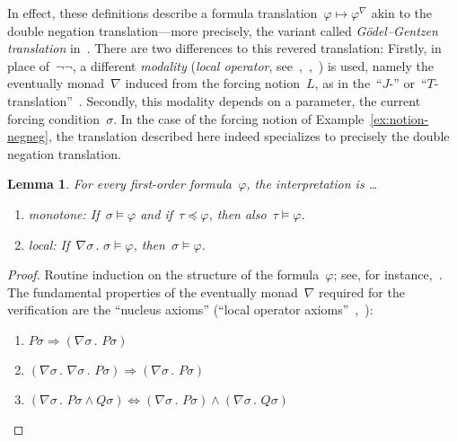 \documentclass[com,11pt,crcready]{iosart2x}
\theoremstyle{definition}
\theoremstyle{plain}
\newtheorem{lemma}[definition]{Lemma}
\theoremstyle{remark}
\newcommand{\?}{\,{:}\,}
\newcommand{\forces}{\vDash}
\renewcommand{\_}{\mathpunct{.}\,}
\begin{document}
In effect, these definitions describe a formula translation~$\varphi \mapsto
\varphi^\nabla$ akin to the double negation translation---more precisely, the
variant called \emph{Gödel--Gentzen translation} in~\cite{ferreira-oliva:translation2,ferreira-oliva:translation}.
There are two differences to this revered translation: Firstly, in place
of~$\neg\neg$, a different \emph{modality} (\emph{local operator},
see~\cite[Section~14.5]{goldblatt:topoi},~\cite{goldblatt:modality},~\cite{pfenning-davies:reconstruction})
is used, namely the eventually monad~$\nabla$ induced from the forcing
notion~$L$, as in the~``$J$-'' or~``$T$-translation''~\cite{aczel:russell-prawitz,escardo-oliva:peirce-shift}.
Secondly, this modality depends on a parameter, the current forcing
condition~$\sigma$. In the case of the forcing notion of
Example~\ref{ex:notion-negneg}, the translation described here indeed
specializes to precisely the double negation translation.

\begin{lemma}\label{lemma:kj-basics}For every first-order formula~$\varphi$,
the interpretation is \ldots
\begin{enumerate}
\item[(a)] monotone: If~$\sigma \forces \varphi$ and if~$\tau \preccurlyeq \varphi$,
then also~$\tau \forces \varphi$.
\item[(b)] local: If~$\nabla\sigma\_ \sigma \forces \varphi$,
then~$\sigma \forces \varphi$.
\end{enumerate}
\end{lemma}

\begin{proof}Routine induction on the structure of the formula~$\varphi$; see,
for instance,~\cite[p.~98]{streicher:ctcl}. The fundamental properties of the eventually
monad~$\nabla$ required for the verification are the ``nucleus
axioms'' (``local operator
axioms''~\cite[Section~14.5]{goldblatt:topoi},~\cite{goldblatt:modality}):
\begin{enumerate}
\item $P\sigma \Rightarrow (\nabla\sigma\_P\sigma)$
\item $(\nabla\sigma\_\nabla\sigma\_P\sigma) \Rightarrow
(\nabla\sigma\_P\sigma)$
\item $(\nabla\sigma\_P\sigma\wedge Q\sigma) \Leftrightarrow
(\nabla\sigma\_P\sigma) \wedge (\nabla\sigma\_Q\sigma)$ \qedhere
\end{enumerate}
\end{proof}
\end{document}

